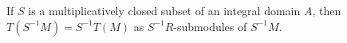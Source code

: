 If $S$ is a multiplicatively closed subset of an integral domain $A$, then
$T(S^{-1}M) = S^{-1}T(M)$ as $S^{-1}R$-submodules of $S^{-1}M$.
